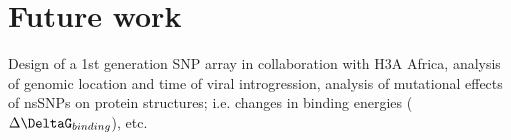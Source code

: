 \chapter{Future work}
\label{chap:future}

Design of a 1st generation SNP array in collaboration with H3A Africa, analysis of genomic location and time of viral introgression, analysis of mutational effects of nsSNPs on protein structures; i.e. changes in binding energies ($\Delta\DeltaG_{binding}$), etc.
